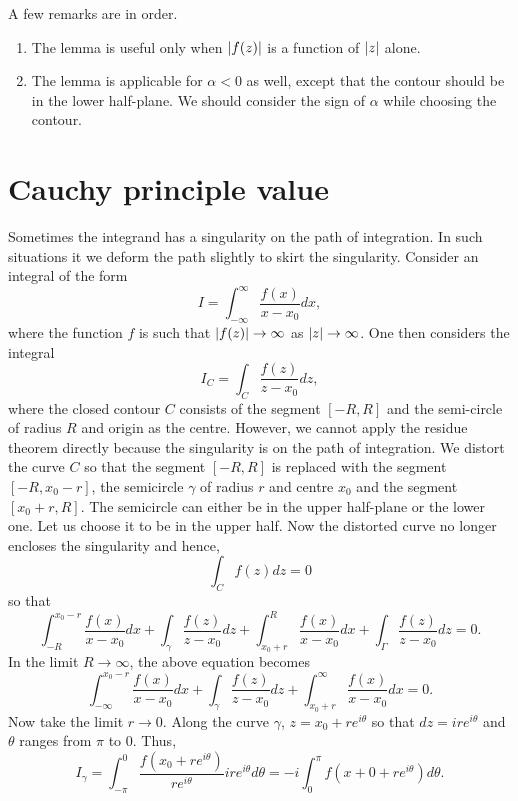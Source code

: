 A few remarks are in order.
\begin{enumerate}
\item The lemma is useful only when $\left\vert{f(z)}\right\vert$ is a function of $\left\vert{z}\right\vert$ alone.
\item The lemma is applicable for $\alpha < 0$ as well, except that the contour
should be in the lower half-plane. We should consider the sign of $\alpha$ while
choosing the contour.
\end{enumerate}

\section{Cauchy principle value}\label{c5s4}
Sometimes the integrand has a singularity on the path of integration. In such 
situations it we deform the path slightly to skirt the singularity. Consider 
an integral of the form
\begin{equation}\label{c5s4e1}
I = \int_{-\infty}^\infty \frac{f(x)}{x - x_0}dx,
\end{equation}
where the function $f$ is such that $\left\vert{f(z)}\right\vert \rightarrow \infty$ as $\left\vert{z}\right\vert
\rightarrow \infty$. One then considers the integral
\[
I_C = \int_C \frac{f(z)}{z - x_0}dz,
\]
where the closed contour $C$ consists of the segment $[-R, R]$ and the semi-circle
of radius $R$ and origin as the centre. However, we cannot apply the residue
theorem directly because the singularity is on the path of integration. We distort
the curve $C$ so that the segment $[-R, R]$ is replaced with the segment $[-R,x_0-r]$,
the semicircle $\gamma$ of radius $r$ and centre $x_0$ and the segment $[x_0+r, R]$.
The semicircle can either be in the upper half-plane or the lower one. Let us choose
it to be in the upper half. Now the distorted curve no longer encloses the singularity
and hence,
\[
\int_C f(z) dz = 0
\]
so that
\[
\int_{-R}^{x_0-r}\frac{f(x)}{x-x_0}dx + \int_\gamma\frac{f(z)}{z-x_0}dz +
\int_{x_0+r}^R\frac{f(x)}{x-x_0}dx + \int_\Gamma\frac{f(z)}{z-x_0}dz = 0.
\]
In the limit $R \rightarrow \infty$, the above equation becomes
\begin{equation}\label{c5s4e2}
\int_{-\infty}^{x_0-r}\frac{f(x)}{x-x_0}dx + \int_\gamma\frac{f(z)}{z-x_0}dz +
\int_{x_0+r}^\infty\frac{f(x)}{x-x_0}dx = 0.
\end{equation}
Now take the limit $r \rightarrow 0$. Along the curve $\gamma$, $z = x_0 + 
re^{i\theta}$ so that $dz = ire^{i\theta}$ and $\theta$ ranges from $\pi$ to
$0$. Thus,
\[
I_\gamma = \int_{-\pi}^0 \frac{f(x_0 + re^{i\theta})}{re^{i\theta}}ire^{i\theta}d\theta
= -i\int_0^\pi f(x+0 + re^{i\theta})d\theta.
\]
